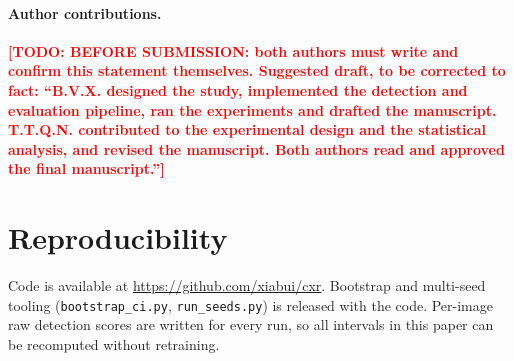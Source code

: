 \documentclass[11pt,a4paper]{article}
\newcommand{\todo}[1]{\textcolor{red}{\textbf{[TODO: #1]}}}
\begin{document}
\paragraph{Author contributions.}
\todo{BEFORE SUBMISSION: both authors must write and confirm this statement themselves. Suggested draft, to be corrected to fact: ``B.V.X. designed the study, implemented the detection and evaluation pipeline, ran the experiments and drafted the manuscript. T.T.Q.N. contributed to the experimental design and the statistical analysis, and revised the manuscript. Both authors read and approved the final manuscript.''}

\section*{Reproducibility}

Code is available at \url{https://github.com/xiabui/cxr}. Bootstrap and multi-seed tooling
(\texttt{bootstrap\_ci.py}, \texttt{run\_seeds.py}) is released with the code.
Per-image raw detection scores are written for every run, so all intervals in
this paper can be recomputed without retraining.





\end{document}
